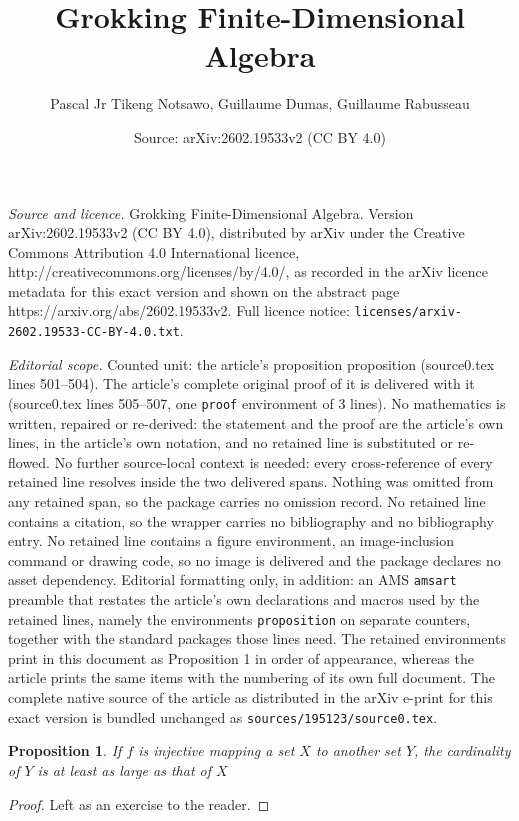 \documentclass[10pt,a4paper]{amsart}
\title{Grokking Finite-Dimensional Algebra}
\author{Pascal Jr Tikeng Notsawo, Guillaume Dumas, Guillaume Rabusseau}
\date{Source: arXiv:2602.19533v2 (CC BY 4.0)}
\newtheorem{proposition}{Proposition}
\begin{document}
\maketitle

\noindent\emph{Source and licence.} Grokking Finite-Dimensional Algebra. Version arXiv:2602.19533v2 (CC BY 4.0), distributed by arXiv under the Creative Commons Attribution 4.0 International licence, http://creativecommons.org/licenses/by/4.0/, as recorded in the arXiv licence metadata for this exact version and shown on the abstract page https://arxiv.org/abs/2602.19533v2. Full licence notice: \texttt{licenses/arxiv-2602.19533-CC-BY-4.0.txt}.\par\smallskip

\noindent\textit{Editorial scope.} Counted unit: the article's proposition proposition (source0.tex lines 501--504). The article's complete original proof of it is delivered with it (source0.tex lines 505--507, one \texttt{proof} environment of 3 lines). No mathematics is written, repaired or re-derived: the statement and the proof are the article's own lines, in the article's own notation, and no retained line is substituted or re-flowed.  No further source-local context is needed: every cross-reference of every retained line resolves inside the two delivered spans.  Nothing was omitted from any retained span, so the package carries no omission record.  No retained line contains a citation, so the wrapper carries no bibliography and no bibliography entry.  No retained line contains a figure environment, an image-inclusion command or drawing code, so no image is delivered and the package declares no asset dependency.  Editorial formatting only, in addition: an AMS \texttt{amsart} preamble that restates the article's own declarations and macros used by the retained lines, namely the environments \texttt{proposition} on separate counters, together with the standard packages those lines need.  The retained environments print in this document as Proposition 1 in order of appearance, whereas the article prints the same items with the numbering of its own full document.  The complete native source of the article as distributed in the arXiv e-print for this exact version is bundled unchanged as \texttt{sources/195123/source0.tex}.
\begin{proposition}
  If $f$ is injective mapping a set $X$ to another set $Y$,
  the cardinality of $Y$ is at least as large as that of $X$
\end{proposition}

\begin{proof}
  Left as an exercise to the reader.
\end{proof}
\end{document}
